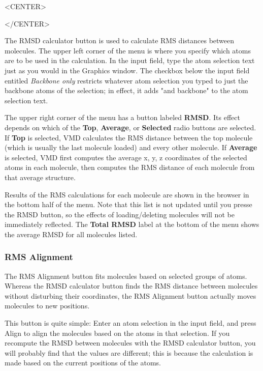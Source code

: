 \begin{rawhtml}
<CENTER>
\end{rawhtml}
\begin{rawhtml}
</CENTER>
\end{rawhtml}

The RMSD calculator button is used to calculate RMS distances between molecules.
The upper left corner of the menu is where you specify which atoms are to be
used in the calculation.  In the input field, type the atom selection text
just as you would in the Graphics window.  The checkbox below the input field
entitled {\it Backbone only} restricts whatever atom selection you typed to just
the backbone atoms of the selection; in effect, it adds "and backbone" to the
atom selection text. 

The upper right corner of the menu has a button labeled {\bf RMSD}.  Its effect
depends on which of the {\bf Top}, {\bf Average}, or
{\bf Selected} radio buttons are selected.
If {\bf Top} is selected, VMD calculates the RMS distance between the top 
molecule (which is usually the last molecule loaded) and every other molecule.
If {\bf Average} is selected, VMD first computes the average x, y, z 
coordinates of the selected atoms in each molecule, then computes the 
RMS distance of each molecule from that average structure.

Results of the RMS calculations for each molecule are shown in the browser in 
the bottom half of the menu.  Note that this list is not updated until you
presse the RMSD button, so the effects of loading/deleting molecules will 
not be immediately reflected.  The {\bf Total RMSD} label at the bottom of the
menu shows the average RMSD for all molecules listed.

\subsubsection{RMS Alignment}

The RMS Alignment button fits molecules based on selected groups of atoms.
Whereas the RMSD calculator button finds the RMS distance between molecules 
without disturbing their coordinates, the RMS Alignment button actually moves 
molecules to new positions.

This button is quite simple: Enter an atom selection in the input field, and 
press Align to align the molecules based on the atoms in that selection.
If you recompute the RMSD between molecules with the RMSD calculator button, 
you will probably find that the values are different; this is because the 
calculation is made based on the current positions of the atoms.

